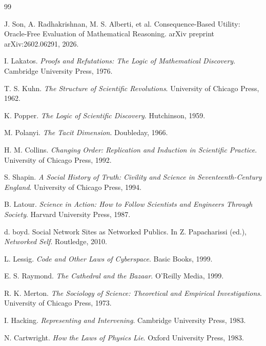 \documentclass[11pt]{article}
\begin{document}
\newpage
\begin{thebibliography}{99}

J. Son, A. Radhakrishnan, M. S. Alberti, et al.
\newblock Consequence-Based Utility: Oracle-Free Evaluation of Mathematical Reasoning.
\newblock arXiv preprint arXiv:2602.06291, 2026.

I. Lakatos.
\newblock \emph{Proofs and Refutations: The Logic of Mathematical Discovery}.
\newblock Cambridge University Press, 1976.

T. S. Kuhn.
\newblock \emph{The Structure of Scientific Revolutions}.
\newblock University of Chicago Press, 1962.

K. Popper.
\newblock \emph{The Logic of Scientific Discovery}.
\newblock Hutchinson, 1959.

M. Polanyi.
\newblock \emph{The Tacit Dimension}.
\newblock Doubleday, 1966.

H. M. Collins.
\newblock \emph{Changing Order: Replication and Induction in Scientific Practice}.
\newblock University of Chicago Press, 1992.

S. Shapin.
\newblock \emph{A Social History of Truth: Civility and Science in Seventeenth-Century England}.
\newblock University of Chicago Press, 1994.

B. Latour.
\newblock \emph{Science in Action: How to Follow Scientists and Engineers Through Society}.
\newblock Harvard University Press, 1987.

d. boyd.
\newblock Social Network Sites as Networked Publics.
\newblock In Z. Papacharissi (ed.), \emph{Networked Self}. Routledge, 2010.

L. Lessig.
\newblock \emph{Code and Other Laws of Cyberspace}.
\newblock Basic Books, 1999.

E. S. Raymond.
\newblock \emph{The Cathedral and the Bazaar}.
\newblock O'Reilly Media, 1999.

R. K. Merton.
\newblock \emph{The Sociology of Science: Theoretical and Empirical Investigations}.
\newblock University of Chicago Press, 1973.

I. Hacking.
\newblock \emph{Representing and Intervening}.
\newblock Cambridge University Press, 1983.

N. Cartwright.
\newblock \emph{How the Laws of Physics Lie}.
\newblock Oxford University Press, 1983.


\end{thebibliography}
\end{document}
